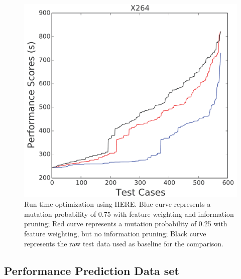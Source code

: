 \documentclass[conference]{IEEEtran}
\begin{document}
\begin{figure}[htbp!]
\begin{minipage}{0.30\linewidth}
\includegraphics[width=\linewidth]{_figs/X264.pdf}
\end{minipage}
\caption{Run time optimization using HERE. Blue curve represents a mutation probability of 0.75 with feature weighting and information pruning; Red curve represents a mutation probability of 0.25 with feature weighting, but no information pruning; Black curve represents the raw test data used as baseline for the comparison.}
\label{fig:pp}
\end{figure}


\subsection{Performance Prediction Data set}
\end{document}
